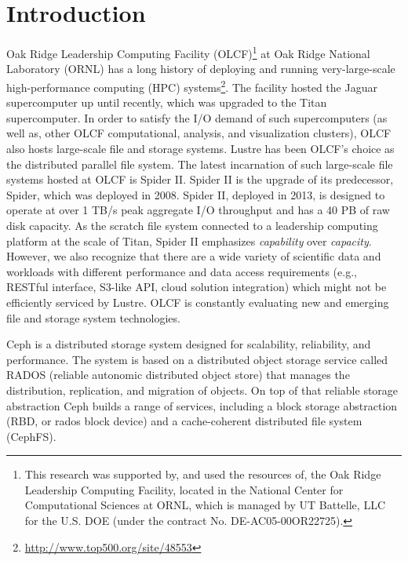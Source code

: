 \section{Introduction}

Oak Ridge Leadership Computing Facility (OLCF)\footnote{This research was
supported by, and used the resources of, the Oak Ridge Leadership Computing
Facility, located in the National Center for Computational Sciences at ORNL,
which is managed by UT Battelle, LLC for the U.S. DOE (under the contract No.
DE-AC05-00OR22725).} at Oak Ridge National Laboratory (ORNL) has a long history
of deploying and running very-large-scale high-performance computing (HPC)
systems\footnote{\url{http://www.top500.org/site/48553}}. The facility hosted
the Jaguar supercomputer up until recently, which was upgraded to the Titan
supercomputer. In order to satisfy the I/O demand of such supercomputers (as
well as, other OLCF computational, analysis, and visualization clusters), OLCF
also hosts large-scale file and storage systems. Lustre has been OLCF's choice
as the distributed parallel file system.  The latest incarnation of such
large-scale file systems hosted at OLCF is Spider II\cite{spider2}. Spider II
is the upgrade of its predecessor, Spider, which was deployed in 2008.
Spider II, deployed in 2013, is designed to operate at over 1 TB/s peak
aggregate I/O throughput and has a 40 PB of raw disk capacity. As the scratch
file system connected to a leadership computing platform at the scale of Titan,
Spider II emphasizes \textit{capability} over \textit{capacity}. However, we
also recognize that there are a wide variety of scientific data and workloads
with different performance and data access requirements (e.g., RESTful
interface, S3-like API, cloud solution integration) which might not be
efficiently serviced by Lustre. OLCF is constantly evaluating new and emerging
file and storage system technologies.  

Ceph\cite{Weil:2006:Ceph} is a distributed storage system designed for
scalability, reliability, and performance.  The system is based on a
distributed object storage service called RADOS (reliable autonomic distributed
object store) that manages the distribution, replication, and migration of
objects.  On top of that reliable storage abstraction Ceph builds a range of
services, including a block storage abstraction (RBD, or rados block device)
and a cache-coherent distributed file system (CephFS).

